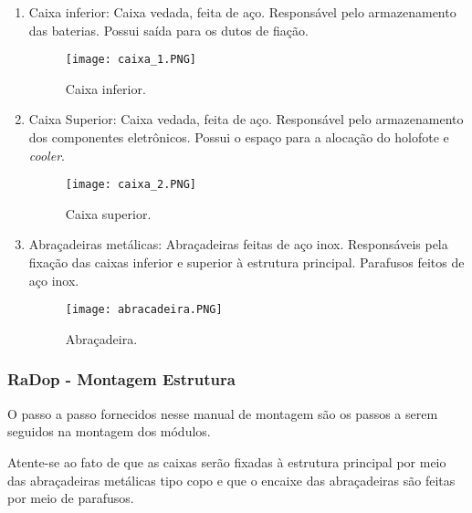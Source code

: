 \begin{itemize}
\begin{enumerate}
                \item Caixa inferior: Caixa vedada, feita de aço. Responsável pelo armazenamento das baterias. Possui saída para os dutos de fiação.
                
        \begin{figure}[H]
            \centering
            \texttt{[image: caixa\_1.PNG]}
            \caption{Caixa inferior.}
            \label{fig:my_label}
        \end{figure}
        
                \item Caixa Superior: Caixa vedada, feita de aço. Responsável pelo armazenamento dos componentes eletrônicos. Possui o espaço para a alocação do holofote e \emph{cooler}.
                
        \begin{figure}[H]
            \centering
            \texttt{[image: caixa\_2.PNG]}
            \caption{Caixa superior.}
            \label{fig:my_label}
        \end{figure}
        
                \item Abraçadeiras metálicas: Abraçadeiras feitas de aço inox. Responsáveis pela fixação das caixas inferior e superior à estrutura principal.
                Parafusos feitos de aço inox.
                
        \begin{figure}[H]
            \centering
            \texttt{[image: abracadeira.PNG]}
            \caption{Abraçadeira.}
            \label{fig:my_label}
        \end{figure}
         

            \end{enumerate}
             \end{itemize}
        
        \subsubsection{RaDop - Montagem Estrutura}
        
        O passo a passo fornecidos nesse manual de montagem são os passos a serem seguidos na montagem dos módulos. 
        
        Atente-se ao fato de que as caixas serão fixadas à estrutura principal por meio das abraçadeiras metálicas tipo copo e que o encaixe das abraçadeiras são feitas por meio de parafusos. 
        
